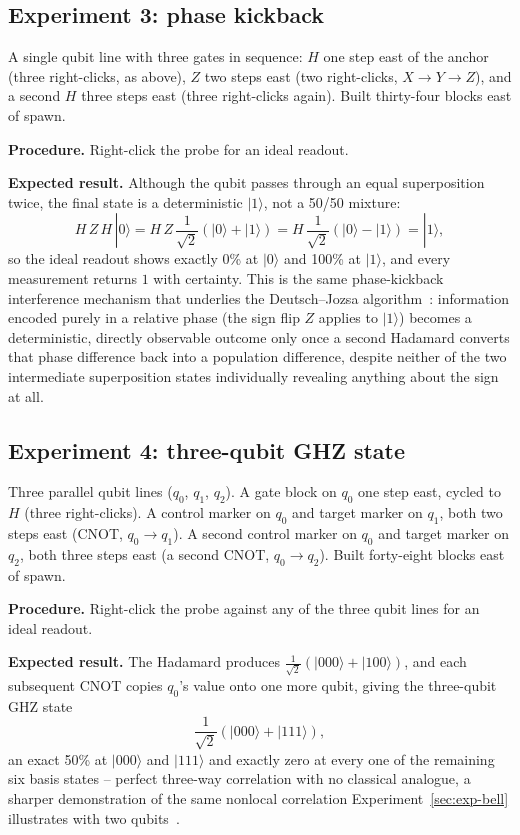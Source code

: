 \subsection{Experiment 3: phase kickback}
\label{sec:exp-kickback}

A single qubit line with three gates in sequence: $H$ one step east of the anchor (three
right-clicks, as above), $Z$ two steps east (two right-clicks, $X \to Y \to Z$), and a second
$H$ three steps east (three right-clicks again). Built thirty-four blocks east of spawn.

\textbf{Procedure.} Right-click the probe for an ideal readout.

\textbf{Expected result.} Although the qubit passes through an equal superposition twice, the
final state is a deterministic $|1\rangle$, not a 50/50 mixture:
\begin{equation}
H\,Z\,H\,|0\rangle = H\,Z\,\frac{1}{\sqrt2}(|0\rangle+|1\rangle)
= H\,\frac{1}{\sqrt2}(|0\rangle-|1\rangle) = |1\rangle,
\end{equation}
so the ideal readout shows exactly 0\% at $|0\rangle$ and 100\% at $|1\rangle$, and every
measurement returns $1$ with certainty. This is the same phase-kickback interference
mechanism that underlies the Deutsch--Jozsa
algorithm~\cite{deutschjozsa1992rapid}: information encoded purely in a relative phase (the
sign flip $Z$ applies to $|1\rangle$) becomes a deterministic, directly observable outcome
only once a second Hadamard converts that phase difference back into a population difference,
despite neither of the two intermediate superposition states individually revealing anything
about the sign at all.

\subsection{Experiment 4: three-qubit GHZ state}
\label{sec:exp-ghz}

Three parallel qubit lines ($q_0$, $q_1$, $q_2$). A gate block on $q_0$ one step east,
cycled to $H$ (three right-clicks). A control marker on $q_0$ and target marker on $q_1$, both
two steps east (CNOT, $q_0 \to q_1$). A second control marker on $q_0$ and target marker on
$q_2$, both three steps east (a second CNOT, $q_0 \to q_2$). Built forty-eight blocks east of
spawn.

\textbf{Procedure.} Right-click the probe against any of the three qubit lines for an ideal
readout.

\textbf{Expected result.} The Hadamard produces
$\frac{1}{\sqrt2}(|000\rangle + |100\rangle)$, and each subsequent CNOT copies $q_0$'s value
onto one more qubit, giving the three-qubit GHZ state~\cite{ghz1989going}
\begin{equation}
\frac{1}{\sqrt2}\left(|000\rangle + |111\rangle\right),
\end{equation}
an exact 50\% at $|000\rangle$ and $|111\rangle$ and exactly zero at every one of the
remaining six basis states -- perfect three-way correlation with no classical analogue, a
sharper demonstration of the same nonlocal correlation Experiment~\ref{sec:exp-bell}
illustrates with two qubits~\cite{ghz1989going}.

